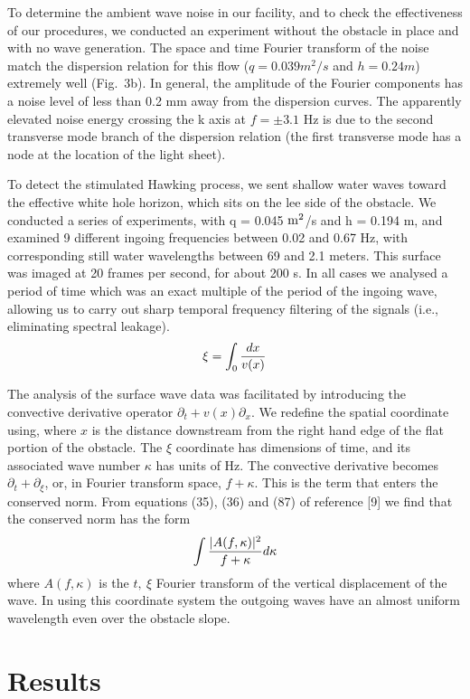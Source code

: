\documentclass[12pt,aps%
]{revtex4}
\def\bea{\begin{eqnarray}}
\def\eea{\end{eqnarray}}
\begin{document}
To determine the ambient wave noise in our facility, and to check the
effectiveness of our procedures, we conducted an experiment without the
obstacle in place and with no wave generation. The space and time Fourier
transform of the noise match the dispersion relation for this flow ($q = 0.039
m^2/s$ and $h = 0.24 m$) extremely well (Fig.\ 3b). In general, the amplitude of
the Fourier components has a noise level of less than 0.2 mm away from the
dispersion curves. The apparently elevated noise energy crossing the k axis at
$f = \pm 3.1$ Hz is due to the second transverse mode branch of the dispersion
relation (the first transverse mode has a node at the location of the light
sheet).

	To detect the stimulated Hawking process, we sent shallow water waves
toward the effective white hole horizon, which sits on the lee side of the
obstacle. We conducted a series of experiments, with q = 0.045 ${\rm m}^2$/s and h =
0.194 m, and examined 9 different ingoing frequencies between 0.02 and 0.67
Hz, with corresponding still water wavelengths between 69 and 2.1 meters. This
surface was imaged at 20 frames per second, for about 200 s. In all cases we
analysed a period of time which was an exact multiple of the period of the
ingoing wave, allowing us to carry out sharp temporal frequency filtering of
the signals (i.e., eliminating spectral leakage).
\bea
\xi=\int_0 {dx\over v(x)}
\eea

The analysis of the surface wave data was facilitated by introducing the
convective derivative operator $\partial_t + v(x) \partial_x$. We redefine the spatial
coordinate using, where $x$ is the distance downstream from the right hand edge
of the flat portion of the obstacle. The $\xi$ coordinate has dimensions of time,
and its associated wave number $\kappa$ has units of Hz. The convective derivative
becomes $\partial_t + \partial_\xi$, or, in Fourier transform space,  $f +
\kappa$. This is the term that
enters the conserved norm.  From equations (35), (36) 
 and (87) of reference [9] we find that the conserved norm has the form 
\bea
\int{{\vert A(f,\kappa)\vert^2\over f+\kappa} d\kappa}
\eea
where $A(f,\kappa)$ is the $t,~\xi$ Fourier transform of the vertical
displacement of the wave. In using this coordinate system the outgoing waves
have an almost uniform wavelength even over the obstacle slope.

\section{Results}
\end{document}
